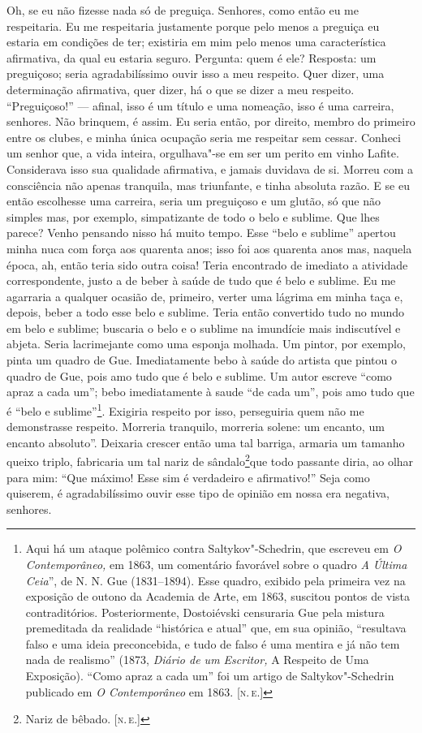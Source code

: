 Oh, se eu não fizesse nada só de preguiça. Senhores, como então eu me
respeitaria. Eu me respeitaria justamente porque pelo menos a preguiça
eu estaria em condições de ter; existiria em mim pelo menos uma
característica afirmativa, da qual eu estaria seguro. Pergunta: quem é
ele? Resposta: um preguiçoso; seria agradabilíssimo ouvir isso a meu
respeito. Quer dizer, uma determinação afirmativa, quer dizer, há o que
se dizer a meu respeito. ``Preguiçoso!'' --- afinal, isso é um título e
uma nomeação, isso é uma carreira, senhores. Não brinquem, é assim. Eu
seria então, por direito, membro do primeiro entre os clubes, e minha
única ocupação seria me respeitar sem cessar. Conheci um senhor que, a
vida inteira, orgulhava"-se em ser um perito em vinho Lafite. Considerava
isso sua qualidade afirmativa, e jamais duvidava de si. Morreu com a
consciência não apenas tranquila, mas triunfante, e tinha absoluta
razão. E se eu então escolhesse uma carreira, seria um preguiçoso e um
glutão, só que não simples mas, por exemplo, simpatizante de todo o belo
e sublime. Que lhes parece? Venho pensando nisso há muito tempo. Esse
``belo e sublime'' apertou minha nuca com força aos quarenta anos; isso
foi aos quarenta anos mas, naquela época, ah, então teria sido outra
coisa! Teria encontrado de imediato a atividade correspondente, justo a
de beber à saúde de tudo que é belo e sublime. Eu me agarraria a
qualquer ocasião de, primeiro, verter uma lágrima em minha taça e,
depois, beber a todo esse belo e sublime. Teria então convertido tudo no
mundo em belo e sublime; buscaria o belo e o sublime na imundície mais
indiscutível e abjeta. Seria lacrimejante como uma esponja molhada. Um
pintor, por exemplo, pinta um quadro de Gue. Imediatamente bebo à saúde
do artista que pintou o quadro de Gue, pois amo tudo que é belo e
sublime. Um autor escreve ``como apraz a cada um''; bebo imediatamente à
saude ``de cada um'', pois amo tudo que é ``belo e sublime''\footnote{Aqui
  há um ataque polêmico contra Saltykov"-Schedrin, que escreveu em
  \emph{O Contemporâneo,} em 1863, um comentário favorável sobre o
  quadro \emph{A Última Ceia}'', de N. N. Gue (1831--1894). Esse quadro,
  exibido pela primeira vez na exposição de outono da Academia de Arte,
  em 1863, suscitou pontos de vista contraditórios. Posteriormente,
  Dostoiévski censuraria Gue pela mistura premeditada da realidade
  ``histórica e atual'' que, em sua opinião, ``resultava falso e uma
  ideia preconcebida, e tudo de falso é uma mentira e já não tem nada de
  realismo'' (1873, \emph{Diário de um Escritor,} A Respeito de Uma
  Exposição). ``Como apraz a cada um'' foi um artigo de
  Saltykov"-Schedrin publicado em \emph{O Contemporâneo} em 1863. {[}\textsc{n.\,e.}{]}}. Exigiria respeito por isso, perseguiria quem não me demonstrasse
respeito. Morreria tranquilo, morreria solene: um encanto, um encanto
absoluto''. Deixaria crescer então uma tal barriga, armaria um tamanho
queixo triplo, fabricaria um tal nariz de sândalo\footnote{Nariz de
  bêbado. {[}\textsc{n.\,e.}{]}}que todo passante diria, ao olhar para mim: ``Que
máximo! Esse sim é verdadeiro e afirmativo!'' Seja como quiserem, é
agradabilíssimo ouvir esse tipo de opinião em nossa era negativa,
senhores.

